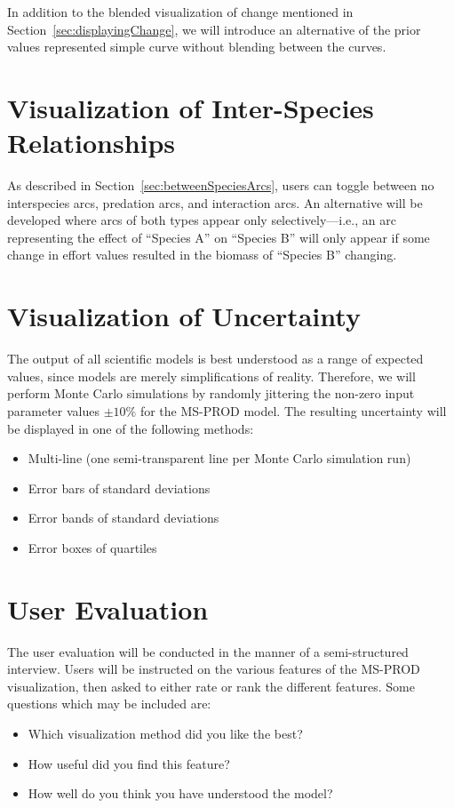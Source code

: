 In addition to the blended visualization of change mentioned in Section~\ref{sec:displayingChange}, we will introduce an alternative of the prior values represented simple curve without blending between the curves.

\section{Visualization of Inter-Species Relationships}

As described in Section~\ref{sec:betweenSpeciesArcs}, users can toggle between no interspecies arcs, predation arcs, and interaction arcs.  An alternative will be developed where arcs of both types appear only selectively---i.e., an arc representing the effect of ``Species A'' on ``Species B'' will only appear if some change in effort values resulted in the biomass of ``Species B'' changing.

\section{Visualization of Uncertainty}

The output of all scientific models is best understood as a range of expected values, since models are merely simplifications of reality.  Therefore, we will perform Monte Carlo simulations by randomly jittering the non-zero input parameter values $\pm 10\%$ for the MS-PROD model.  The resulting uncertainty will be displayed in one of the following methods:

 \begin{itemize}
   \item Multi-line (one semi-transparent line per Monte Carlo simulation run)
   \item Error bars of standard deviations
   \item Error bands of standard deviations
   \item Error boxes of quartiles
 \end{itemize}

\section{User Evaluation}

The user evaluation will be conducted in the manner of a semi-structured interview.  Users will be instructed on the various features of the MS-PROD visualization, then asked to either rate or rank the different features.  Some questions which may be included are:

\begin{itemize}
  \item Which visualization method did you like the best?
  \item How useful did you find this feature?
  \item How well do you think you have understood the model?
\end{itemize}
